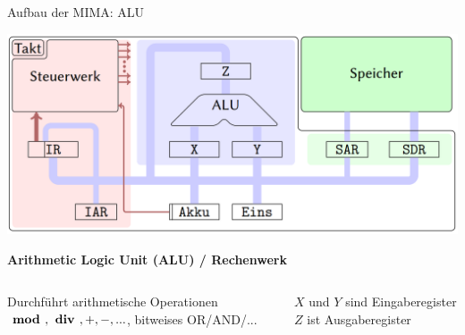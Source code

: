 \begin{frame}{Aufbau der MIMA: ALU}
	\begin{center}\includegraphics[width=.6\textwidth]{images/mima_aufbau.png}\end{center}
	
	\bp
	
	\textcolor{kit-blue50}{\textbf{Arithmetic Logic Unit (ALU) / Rechenwerk}}
	
	\begin{columns}
		\begin{column}{0.5\textwidth}
			\begin{itemize}
				\pitem Durchführt arithmetische Operationen
				\pitem $\textbf{ mod }, \textbf{ div }, +, -, ...$, bitweises OR/AND/...
			\end{itemize}
		\end{column}
		
		\begin{column}{0.5\textwidth}
			\begin{itemize}
				\pitem $X$ und $Y$ sind Eingaberegister
				\pitem $Z$ ist Ausgaberegister
			\end{itemize}
		\end{column}
	\end{columns}

\end{frame}


